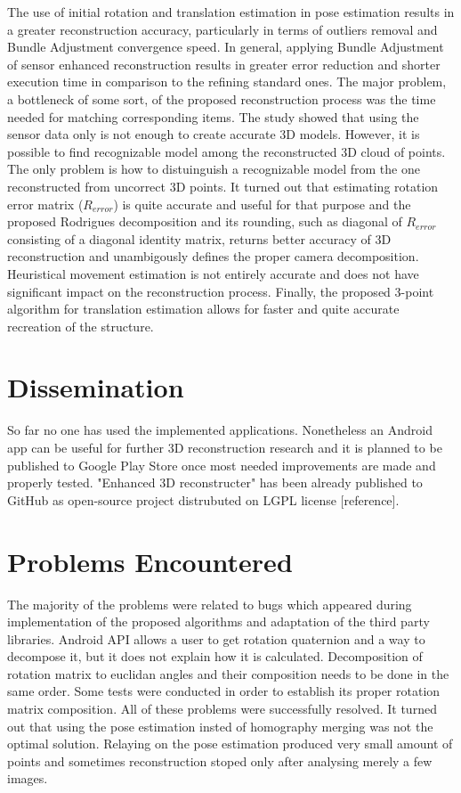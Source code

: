 The use of initial rotation and translation estimation in pose estimation results in a greater reconstruction accuracy, particularly in terms of outliers removal and Bundle Adjustment convergence speed. 
In general, applying Bundle Adjustment of sensor enhanced reconstruction results in greater error reduction and shorter execution time in comparison to the refining standard ones. The major problem, a bottleneck of some sort, of the proposed reconstruction process was the time needed for matching corresponding items. 
The study showed that using the sensor data only is not enough to create accurate 3D models. However, it is possible to find recognizable model among the reconstructed 3D cloud of points. The only problem is how to distuinguish a recognizable model from the one reconstructed from uncorrect 3D points. It turned out that estimating rotation error matrix ($R_{error}$) is quite accurate and useful for that purpose and the proposed Rodrigues decomposition and its rounding, such as diagonal of $R_{error}$ consisting of a diagonal identity matrix, returns better accuracy of 3D reconstruction and unambigously defines the proper camera decomposition. Heuristical movement estimation is not entirely accurate and does not have significant impact on the reconstruction process. Finally, the proposed 3-point algorithm for translation estimation allows for faster and quite accurate recreation of the structure.
\section{Dissemination}
So far no one has used the implemented applications. Nonetheless an Android app can be useful for further 3D reconstruction research and it is planned to be published to Google Play Store once most needed improvements are made and properly tested. "Enhanced 3D reconstructer" has been already published to GitHub as open-source project distrubuted on LGPL license [reference].
\section{Problems Encountered}
The majority of the problems were related to bugs which appeared during implementation of the proposed algorithms and adaptation of the third party libraries. Android API allows a user to get rotation quaternion and a way to decompose it, but it does not explain how it is calculated. Decomposition of rotation matrix to euclidan angles and their composition needs to be done in the same order. Some tests were conducted in order to establish its proper rotation matrix composition. All of these problems were successfully resolved. It turned out that using the pose estimation insted of homography merging was not the optimal solution. Relaying on the pose estimation produced very small amount of points and sometimes reconstruction stoped only after analysing merely a few images.
